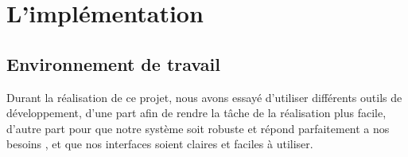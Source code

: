 \chapter{L’implémentation}

\section{Environnement de travail}
Durant la réalisation de ce projet, nous avons essayé d’utiliser différents
outils de développement, d’une part afin de rendre la tâche de la
réalisation plus facile, d’autre part pour que notre système soit robuste et
répond parfaitement a nos besoins , et que nos interfaces soient claires et
faciles à utiliser.

